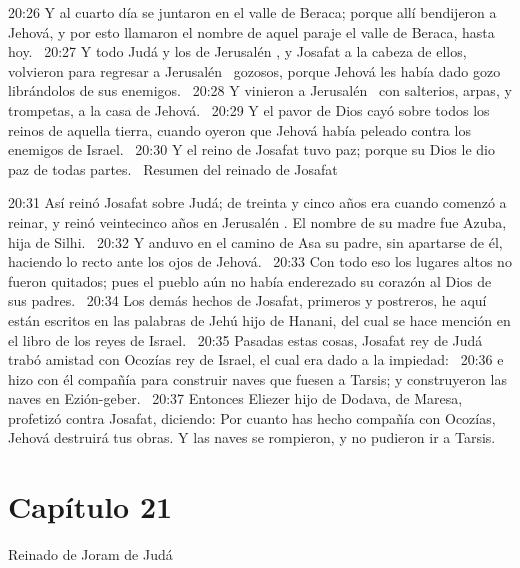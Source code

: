 																				20:26 Y al cuarto día se juntaron en el valle de Beraca; porque allí bendijeron a Jehová, y por esto llamaron el nombre de aquel paraje el valle de Beraca, hasta hoy.  
																				20:27 Y todo Judá y los de Jerusalén , y Josafat a la cabeza de ellos, volvieron para regresar a Jerusalén  gozosos, porque Jehová les había dado gozo librándolos de sus enemigos.  
																				20:28 Y vinieron a Jerusalén  con salterios, arpas, y trompetas, a la casa de Jehová.  
																				20:29 Y el pavor de Dios cayó sobre todos los reinos de aquella tierra, cuando oyeron que Jehová había peleado contra los enemigos de Israel.  
																				20:30 Y el reino de Josafat tuvo paz; porque su Dios le dio paz de todas partes.  
																				Resumen del reinado de Josafat  
																				
																				20:31 Así reinó Josafat sobre Judá; de treinta y cinco años era cuando comenzó a reinar, y reinó veintecinco años en Jerusalén . El nombre de su madre fue Azuba, hija de Silhi.  
																				20:32 Y anduvo en el camino de Asa su padre, sin apartarse de él, haciendo lo recto ante los ojos de Jehová.  
																				20:33 Con todo eso los lugares altos no fueron quitados; pues el pueblo aún no había enderezado su corazón al Dios de sus padres.  
																				20:34 Los demás hechos de Josafat, primeros y postreros, he aquí están escritos en las palabras de Jehú hijo de Hanani, del cual se hace mención en el libro de los reyes de Israel.  
																				20:35 Pasadas estas cosas, Josafat rey de Judá trabó amistad con Ocozías rey de Israel, el cual era dado a la impiedad:  
																				20:36 e hizo con él compañía para construir naves que fuesen a Tarsis; y construyeron las naves en Ezión-geber.  
																				20:37 Entonces Eliezer hijo de Dodava, de Maresa, profetizó contra Josafat, diciendo: Por cuanto has hecho compañía con Ocozías, Jehová destruirá tus obras. Y las naves se rompieron, y no pudieron ir a Tarsis.  
																				\section*{Capítulo 21 }
																					Reinado de Joram de Judá  
																					
